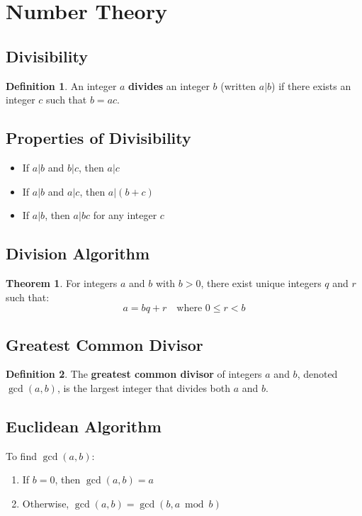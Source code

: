 \documentclass[11pt]{article}
\theoremstyle{definition}
\newtheorem{definition}{Definition}[section]
\newtheorem{theorem}{Theorem}[section]
\begin{document}
\section{Number Theory}

\subsection{Divisibility}
\begin{definition}
An integer $a$ \textbf{divides} an integer $b$ (written $a | b$) if there exists an integer $c$ such that $b = ac$.
\end{definition}

\subsection{Properties of Divisibility}
\begin{itemize}
    \item If $a | b$ and $b | c$, then $a | c$
    \item If $a | b$ and $a | c$, then $a | (b + c)$
    \item If $a | b$, then $a | bc$ for any integer $c$
\end{itemize}

\subsection{Division Algorithm}
\begin{theorem}
For integers $a$ and $b$ with $b > 0$, there exist unique integers $q$ and $r$ such that:
$$a = bq + r \quad \text{where } 0 \leq r < b$$
\end{theorem}

\subsection{Greatest Common Divisor}
\begin{definition}
The \textbf{greatest common divisor} of integers $a$ and $b$, denoted $\gcd(a,b)$, is the largest integer that divides both $a$ and $b$.
\end{definition}

\subsection{Euclidean Algorithm}
To find $\gcd(a,b)$:
\begin{enumerate}
    \item If $b = 0$, then $\gcd(a,b) = a$
    \item Otherwise, $\gcd(a,b) = \gcd(b, a \bmod b)$
\end{enumerate}
\end{document}
